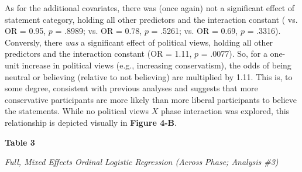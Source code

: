 \documentclass[12pt]{article}  %
\begin{document}
As for the additional covariates, there was (once again) not a significant effect of statement category, holding all other predictors and the interaction constant ( vs.  OR = 0.95, $p$ = .8989;  vs.  OR = 0.78, $p$ = .5261;  vs.  OR = 0.69, $p$ = .3316). Conversly, there \textit{was} a significant effect of political views, holding all other predictors and the interaction constant (OR = 1.11, $p$ = .0077). So, for a one-unit increase in political views (e.g., increasing conservatism), the odds of being neutral or believing (relative to not believing) are multiplied by 1.11. This is, to some degree, consistent with previous analyses and suggests that more conservative participants are more likely than more liberal participants to believe the statements. While no political views $X$ phase interaction was explored, this relationship is depicted visually in \textbf{Figure 4-B}.


\newpage

\textbf{Table 3}

\textit{Full, Mixed Effects Ordinal Logistic Regression (Across Phase; Analysis \#3)}

\vspace{0.5cm}
\end{document}

